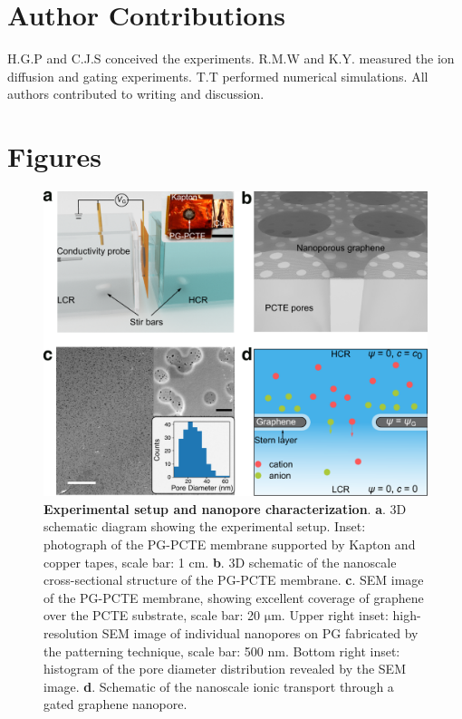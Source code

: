 \documentclass[journal=langd5,email=true, hyperref=true, keywords=false]{achemso}
\begin{document}
\section{Author Contributions}
\label{sec:author}

H.G.P and C.J.S conceived the experiments. R.M.W and K.Y. measured the ion
diffusion and gating experiments. T.T performed numerical
simulations. All authors contributed to writing and discussion.


\section*{}
\label{sec:ref}


\clearpage
\section{Figures}
\label{sec:figs}

\begin{figure}[htbp]
  \centering
  \includegraphics[width=0.95\linewidth]{img/fig1.pdf}
  \caption{\textbf{Experimental setup and nanopore characterization}.
    \textbf{a}. 3D schematic diagram showing the experimental
    setup. Inset: photograph of the PG-PCTE membrane supported by
    Kapton and copper tapes, scale bar: 1 cm. \textbf{b}. 3D schematic
    of the nanoscale cross-sectional structure of the PG-PCTE
    membrane. \textbf{c}. SEM image of the PG-PCTE membrane, showing
    excellent coverage of graphene over the PCTE substrate, scale bar:
    20 $\mathrm{\mu}$m.  Upper right inset: high-resolution SEM image
    of individual nanopores on PG fabricated by the patterning
    technique, scale bar: 500 nm. Bottom right inset: histogram of the
    pore diameter distribution revealed by the SEM
    image. \textbf{d}. Schematic of the nanoscale ionic transport
    through a gated graphene nanopore.}
  \label{fig:1}
\end{figure}
\end{document}
